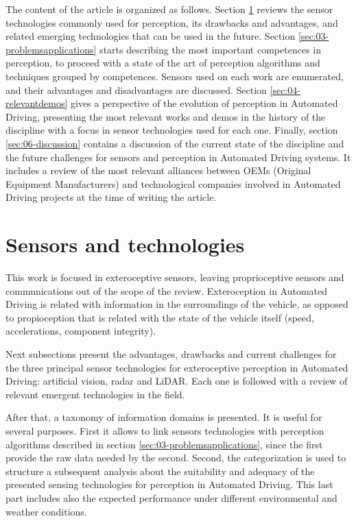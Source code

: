 \documentclass[journal]{IEEEtran}
\begin{document}
The content of the article is organized as follows. Section 
\ref{sec:02-sensors} reviews the sensor technologies commonly used for 
perception, its drawbacks and advantages, and related emerging 
technologies that can be used in the future. 
Section \ref{sec:03-problemsapplications} starts describing the most important 
competences in perception, to proceed with a state of the art of perception 
algorithms and techniques grouped by competences. Sensors used on each work
are enumerated, and their advantages and disadvantages are discussed. 
Section \ref{sec:04-relevantdemos} gives a perspective of the evolution of
perception in Automated Driving, presenting the most relevant works and demos
in the history of the discipline with a focus in sensor technologies used for
each one. 
Finally, section \ref{sec:06-discussion} contains a discussion of the current
state of the discipline and the future challenges for sensors and perception in
Automated Driving systems. It includes a review of the most relevant alliances 
between OEMs (Original Equipment Manufacturers) and technological companies
involved in Automated Driving projects at the time of writing the article.

\section{Sensors and technologies}
\label{sec:02-sensors}

This work is focused in exteroceptive sensors, leaving proprioceptive sensors
and communications out of the scope of the review.
Exteroception in Automated Driving is related with information in the
surroundings of the vehicle, as opposed to propioception that is related with 
the state of the vehicle itself (speed, accelerations, component integrity). 

Next subsections present the advantages, drawbacks and current challenges for 
the three principal sensor technologies for exteroceptive perception in
Automated Driving: artificial vision, radar and LiDAR. 
Each one is followed with a review of relevant emergent technologies in the
field.

After that, a taxonomy of information domains is presented. It is useful for
several purposes. First it allows to link sensors technologies with perception 
algorithms described in section \ref{sec:03-problemsapplications}, 
since the first provide the raw data needed by the second. 
Second, the categorization is used to structure a subsequent
analysis about the suitability and adequacy of the presented sensing 
technologies for perception in Automated Driving. 
This last part includes also the expected performance under different
environmental and weather conditions.
\end{document}
